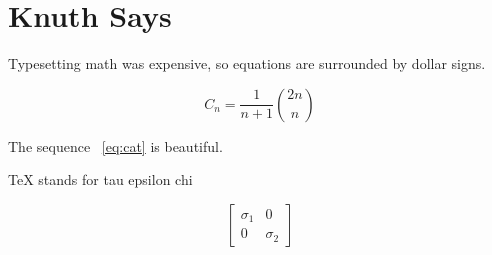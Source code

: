\section{Knuth Says}



Typesetting math was expensive, so equations are surrounded by dollar signs.



\begin{equation} \label{eq:cat}  
    C_n = \frac{1}{n+1} \binom{2n}{n}
\end{equation}




\noindent The sequence ~\ref{eq:cat} is beautiful.





\begin{verbatim*}      
TeX stands for tau  epsilon chi
\end{verbatim*}

\begin{equation*}
    \begin{bmatrix}
        \sigma_1 & 0 \\
        0 & \sigma_2
    \end{bmatrix}
\end{equation*}

